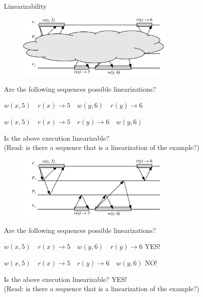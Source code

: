 \begin{frame}{Linearizability}

\begin{overprint}
\begin{figure}
\includegraphics[width=0.7\textwidth]{figs/09/lin-03}
\end{figure}

\begin{example}
\BI
\item Are the following sequences possible linearizations?
\BI
\item $w(x,5) \quad r(x) \rightarrow 5 \quad w(y,6) \quad r(y) \rightarrow 6$
\item $w(x,5) \quad r(x) \rightarrow 5 \quad r(y) \rightarrow 6 \quad w(y,6)$
\EI
\item Is the above execution linearizable?\\ (Read: is there a sequence that is a linearization of the example?)
\EI
\end{example}

\begin{figure}
\includegraphics[width=0.7\textwidth]{figs/09/lin-03n}
\end{figure}

\begin{example}

\BI
\item Are the following sequences possible linearizations?
\BI
\item $w(x,5) \quad r(x) \rightarrow 5 \quad w(y,6) \quad r(y) \rightarrow 6$ \qquad YES!
\item $w(x,5) \quad r(x) \rightarrow 5 \quad r(y) \rightarrow 6 \quad w(y,6)$ \qquad NO!
\EI
\item Is the above execution linearizable? \qquad YES!\\ (Read: is there a sequence that is a linearization of the example?)
\EI
\end{example}

\end{overprint}
\end{frame}


